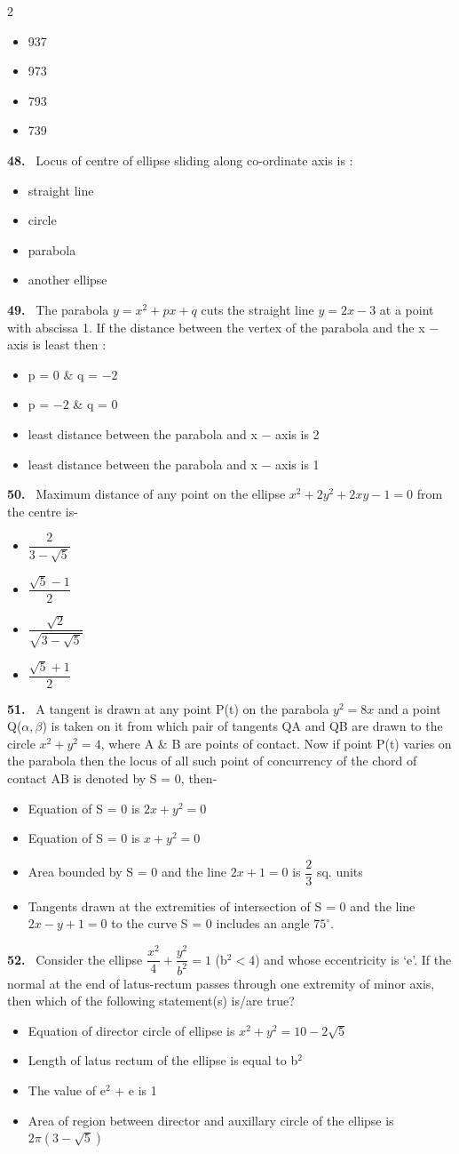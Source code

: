 \documentclass[10pt]{extarticle}
\newcommand{\qn}[1]{\par\smallskip\noindent\textbf{#1.}~}
\newenvironment{qoptions}{\begin{itemize}[leftmargin=1.8em,itemsep=1pt,topsep=2pt,label={}]}{\end{itemize}}
\newcommand{\opt}[2]{\item[(#1)] #2}
\begin{document}
\begin{multicols}{2}
\begin{qoptions}
\opt{A}{937}
\opt{B}{973}
\opt{C}{793}
\opt{D}{739}
\end{qoptions}
\qn{48} Locus of centre of ellipse sliding along co-ordinate axis is :
\begin{qoptions}
\opt{A}{straight line}
\opt{B}{circle}
\opt{C}{parabola}
\opt{D}{another ellipse}
\end{qoptions}
\qn{49} The parabola $y=x^2+px+q$ cuts the straight line $y=2x-3$ at a point with abscissa 1. If the distance between the vertex of the parabola and the x $-$ axis is least then :
\begin{qoptions}
\opt{A}{p = 0 \& q = $-2$}
\opt{B}{p = $-2$ \& q = 0}
\opt{C}{least distance between the parabola and x $-$ axis is 2}
\opt{D}{least distance between the parabola and x $-$ axis is 1}
\end{qoptions}
\qn{50} Maximum distance of any point on the ellipse $x^2+2y^2+2xy-1=0$ from the centre is-
\begin{qoptions}
\opt{A}{$\dfrac2{3-\sqrt5}$}
\opt{B}{$\dfrac{\sqrt5-1}2$}
\opt{C}{$\dfrac{\sqrt2}{\sqrt{3-\sqrt5}}$}
\opt{D}{$\dfrac{\sqrt5+1}2$}
\end{qoptions}
\qn{51} A tangent is drawn at any point P(t) on the parabola $y^2=8x$ and a point Q($\alpha,\beta$) is taken on it from which pair of tangents QA and QB are drawn to the circle $x^2+y^2=4$, where A \& B are points of contact. Now if point P(t) varies on the parabola then the locus of all such point of concurrency of the chord of contact AB is denoted by S = 0, then-
\begin{qoptions}
\opt{A}{Equation of S = 0 is $2x+y^2=0$}
\opt{B}{Equation of S = 0 is $x+y^2=0$}
\opt{C}{Area bounded by S = 0 and the line $2x+1=0$ is $\dfrac23$ sq. units}
\opt{D}{Tangents drawn at the extremities of intersection of S = 0 and the line $2x-y+1=0$ to the curve S = 0 includes an angle $75^\circ$.}
\end{qoptions}
\qn{52} Consider the ellipse $\dfrac{x^2}4+\dfrac{y^2}{b^2}=1$ (b$^2<4$) and whose eccentricity is `e'. If the normal at the end of latus-rectum passes through one extremity of minor axis, then which of the following statement(s) is/are true?
\begin{qoptions}
\opt{A}{Equation of director circle of ellipse is $x^2+y^2=10-2\sqrt5$}
\opt{B}{Length of latus rectum of the ellipse is equal to b$^2$}
\opt{C}{The value of e$^2$ + e is 1}
\opt{D}{Area of region between director and auxillary circle of the ellipse is $2\pi\left(3-\sqrt5\right)$}

\end{qoptions}
\end{multicols}
\end{document}
